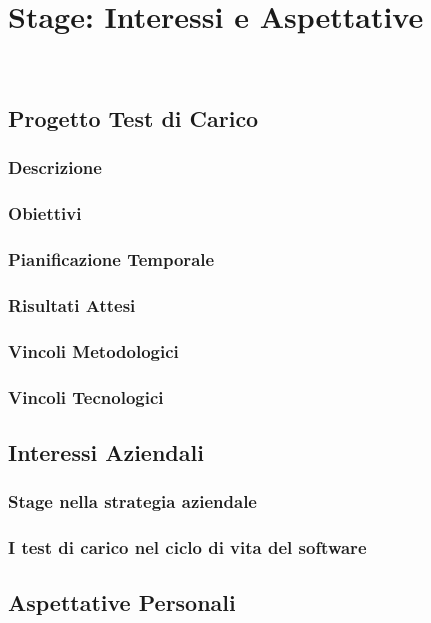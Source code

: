 
\chapter{Stage: Interessi e Aspettative}
\label{cap:processi-metodologie}

\\

\section{Progetto Test di Carico}
\subsection{Descrizione}
\subsection{Obiettivi}
\subsection{Pianificazione Temporale}
\subsection{Risultati Attesi}
\subsection{Vincoli Metodologici}
\subsection{Vincoli Tecnologici}
\section{Interessi Aziendali}
\subsection{Stage nella strategia aziendale}
\subsection{I test di carico nel ciclo di vita del software}
\section{Aspettative Personali}
